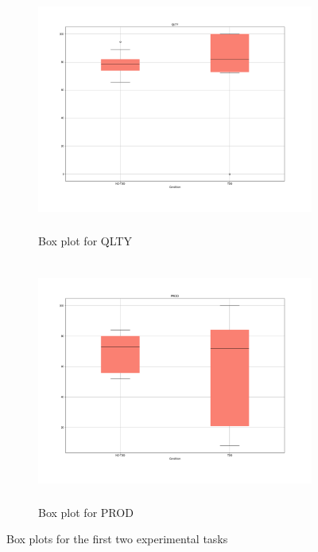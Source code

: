 \begin{figure}[htbp]
    \begin{subfigure}{\textwidth}
        \includegraphics[width=\textwidth, height=8cm]{figures/box_plots/task1_2/QLT.png}
        \caption{Box plot for QLTY}
    \end{subfigure}
    
    \bigskip
    
    \begin{subfigure}{\textwidth}
        \includegraphics[width=\textwidth, height=8cm]{figures/box_plots/task1_2/PRO.png}
        \caption{Box plot for PROD}
    \end{subfigure}
    
    \caption{Box plots for the first two experimental tasks}
    \label{box_plots}
\end{figure}


